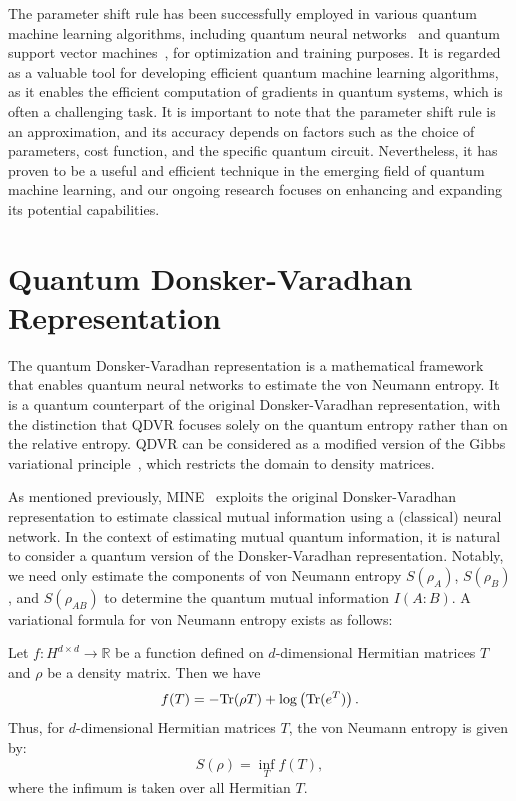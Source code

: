 \documentclass[aps,groupedaddress,superscriptaddress,amssymb,amsmath,amsbsy,amsfonts,twocolumn,pra]{revtex4}
\begin{document}
The parameter shift rule has been successfully employed in various quantum machine learning algorithms, including quantum neural networks~\cite{BBF+20, BLSF19} and quantum support vector machines~\cite{RML14, HCT+19}, for optimization and training purposes. It is regarded as a valuable tool for developing efficient quantum machine learning algorithms, as it enables the efficient computation of gradients in quantum systems, which is often a challenging task. It is important to note that the parameter shift rule is an approximation, and its accuracy depends on factors such as the choice of parameters, cost function, and the specific quantum circuit. Nevertheless, it has proven to be a useful and efficient technique in the emerging field of quantum machine learning, and our ongoing research focuses on enhancing and expanding its potential capabilities.

\section{Quantum Donsker-Varadhan Representation} \label{sec:QDV}
The quantum Donsker-Varadhan representation is a mathematical framework that enables quantum neural networks to estimate the von Neumann entropy. It is a quantum counterpart of the original Donsker-Varadhan representation, with the distinction that QDVR focuses solely on the quantum entropy rather than on the relative entropy. QDVR can be considered as a modified version of the Gibbs variational principle~\cite{H68}, which restricts the domain to density matrices.

As mentioned previously, MINE~\cite{BBR+18} exploits the original Donsker-Varadhan representation to estimate classical mutual information using a (classical) neural network. In the context of estimating mutual quantum information, it is natural to consider a quantum version of the Donsker-Varadhan representation. Notably, we need only estimate the components of von Neumann entropy $S(\rho_A)$, $S(\rho_B)$, and $S(\rho_{AB})$ to determine the quantum mutual information $I(A:B)$. A variational formula for von Neumann entropy exists as follows:

\begin{theorem} \label{gibbs}
Let $f: H^{d \times d} \rightarrow \mathbb{R}$ be a function defined on $d$-dimensional Hermitian matrices $T$ and $\rho$ be a density matrix. Then we have
\begin{equation} \label{eq:qdv}
f(T) = -\mbox{$\textnormal{Tr}$}(\rho T) + \log\left(\mbox{$\textnormal{Tr}$}(e^T)\right).
\end{equation}
Thus, for $d$-dimensional Hermitian matrices $T$, the von Neumann entropy is given by:
\begin{equation} \label{identity}
S(\rho) = \inf_{T} f(T),
\end{equation}
where the infimum is taken over all Hermitian $T$.
\end{theorem}
\end{document}
